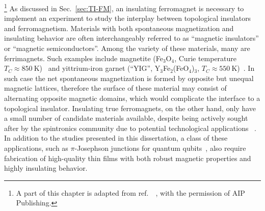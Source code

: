 \footnote[2]{A part of this chapter is adapted from ref.~\cite{EuS_PLD}~, with the permission of AIP Publishing.}%
As discussed in Sec.~\ref{sec:TI-FM}, an insulating ferromagnet is necessary to implement an experiment to study the interplay between topological insulators and ferromagnetism. Materials with both spontaneous magnetization and insulating behavior are often interchangeably referred to as ``magnetic insulators'' or ``magnetic semiconductors''. Among the variety of these materials, many are ferrimagnets. Such examples include magnetite (Fe$_3$O$_4$, Curie temperature $T_C\approx850~\mathrm{K}$)~\cite{Neel1948} and yittrium-iron garnet (``YIG'', Y$_3$Fe$_2$(FeO$_4$)$_3$, $T_C\approx550~\mathrm{K}$)~\cite{YIG}. In such case the net spontaneous magnetization is formed by opposite but unequal magnetic lattices, therefore the surface of these material may consist of alternating opposite magnetic domains, which would complicate the interface to a topological insulator. Insulating true ferromagnets, on the other hand, only have a small number of candidate materials available, despite being actively sought after by the spintronics community due to potential technological applications \cite[][p.~329]{kittel}~\cite{Yi2014, Wolf2001, EuS_spin_filter, EuS_app1, EuS_spin_filter2}. In addition to the studies presented in this dissertation, a class of these applications, such as $\pi$-Josephson junctions for quantum qubits~\cite{pi_qubit, pi_junction, Jing}, also require fabrication of high-quality thin films with both robust magnetic properties and highly insulating behavior.

